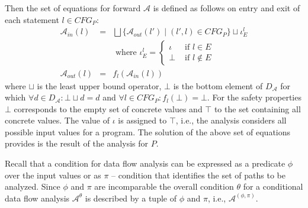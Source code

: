 Then the set of equations for forward $\mathcal{A}$ is defined as follows on entry and exit of each statement $l\in CFG_P$:
\begin{eqnarray*}
\mathcal{A}_{in}(l) &= &\bigsqcup\{\mathcal{A}_{out}(l') \;|\; (l',l)\in CFG_P\}\sqcup \iota_E^l\\
 &  & \text{ where } \iota_E^l = \left\{ \begin{array}{rl}
 \iota &\mbox{ if $l\in E$} \\
  \bot &\mbox{ if $l\not\in E$}
       \end{array}\right. \\
\mathcal{A}_{out}(l) & = & f_l(\mathcal{A}_{in}(l))     
\end{eqnarray*}
where $\sqcup$ is the least upper bound operator, $\bot$ is the bottom element of $D_{\mathcal{A}}$ for which $\forall d\in D_\mathcal{A} : \bot\sqcup d = d$ and $\forall l\in CFG_P :  f_l(\bot)=\bot$. For the safety properties $\bot$ corresponds to the empty set of concrete values and $\top$ to the set containing all concrete values. The value of $\iota$ is assigned to $\top$, i.e., the analysis considers all possible input values for a program. The solution of the above set of equations provides is the result of the analysis for $P$.

Recall that a condition for data flow analysis can be expressed as a predicate $\phi$ over the input values or as $\pi$ -- condition that identifies the set of paths to be analyzed. Since $\phi$ and $\pi$ are incomparable the overall condition $\theta$ for a conditional data flow analysis $\mathcal{A}^\theta$ is described by a tuple of $\phi$ and $\pi$, i.e., $\mathcal{A}^{(\phi,\pi)}$.


